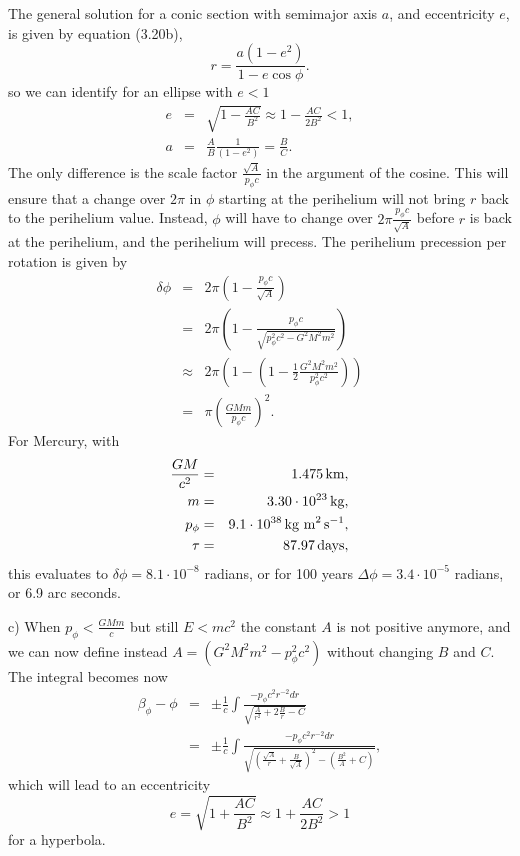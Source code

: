 \documentclass[letterpaper,11pt]{article}
\begin{document}
The general solution for a conic section with semimajor axis $a$, and eccentricity $e$, is given by equation (3.20b),
\begin{equation*}
 r = \frac{a(1 - e^2)}{1 - e \cos\phi}.
\end{equation*}
so we can identify for an ellipse with $e < 1$
\begin{eqnarray*}
 e & = & \sqrt{1 - \frac{AC}{B^2}} \approx 1 - \frac{AC}{2B^2} < 1, \\
 a & = & \frac{A}{B}\frac{1}{(1-e^2)} = \frac{B}{C}.
\end{eqnarray*}
The only difference is the scale factor $\frac{\sqrt{A}}{p_\phi c}$ in the argument of the cosine.  This will ensure that a change over $2\pi$ in $\phi$ starting at the perihelium will not bring $r$ back to the perihelium value.  Instead, $\phi$ will have to change over $2\pi \frac{p_\phi c}{\sqrt{A}}$ before $r$ is back at the perihelium, and the perihelium will precess.  The perihelium precession per rotation is given by
\begin{eqnarray*}
 \delta\phi & = & 2\pi \left(1 - \frac{p_\phi c}{\sqrt{A}}\right) \\
 & = & 2\pi \left(1 - \frac{p_\phi c}{\sqrt{p_\phi^2 c^2 - G^2M^2m^2}} \right) \\
 & \approx & 2\pi \left(1 - \left(1 - \frac{1}{2} \frac{G^2M^2m^2}{p_\phi^2 c^2} \right) \right) \\
 & = & \pi \left( \frac{GMm}{p_\phi c} \right)^2.
\end{eqnarray*}
For Mercury, with
\begin{eqnarray*}
 \frac{GM}{c^2} & = & 1.475\,\hbox{km}, \\
 m & = & 3.30 \cdot 10^{23}\,\hbox{kg}, \\
 p_\phi & = & 9.1 \cdot 10^{38}\,\hbox{kg m}^2\,\hbox{s}^{-1}, \\
 \tau & = & 87.97\,\hbox{days},
\end{eqnarray*}
this evaluates to $\delta\phi = 8.1 \cdot 10^{-8}$ radians, or for 100 years $\Delta\phi = 3.4 \cdot 10^{-5}$ radians, or 6.9 arc seconds.

c) When $p_\phi < \frac{GMm}{c}$ but still $E < mc^2$ the constant $A$ is not positive anymore, and we can now define instead $A = \left(G^2M^2m^2 - p_\phi^2 c^2\right)$ without changing $B$ and $C$.  The integral becomes now
\begin{eqnarray*}
 \beta_\phi - \phi & = & \pm \frac{1}{c} \int \frac{-p_\phi c^2 r^{-2} dr}{\sqrt{\frac{A}{r^2} + 2 \frac{B}{r} - C}} \\
 & = & \pm \frac{1}{c} \int \frac{-p_\phi c^2 r^{-2} dr}{\sqrt{\left(\frac{\sqrt{A}}{r} + \frac{B}{\sqrt{A}}\right)^2 - \left(\frac{B^2}{A} + C\right)}},
\end{eqnarray*}
which will lead to an eccentricity
\begin{equation*}
 e = \sqrt{1 + \frac{AC}{B^2}} \approx 1 + \frac{AC}{2B^2} > 1
\end{equation*}
for a hyperbola.
\end{document}
